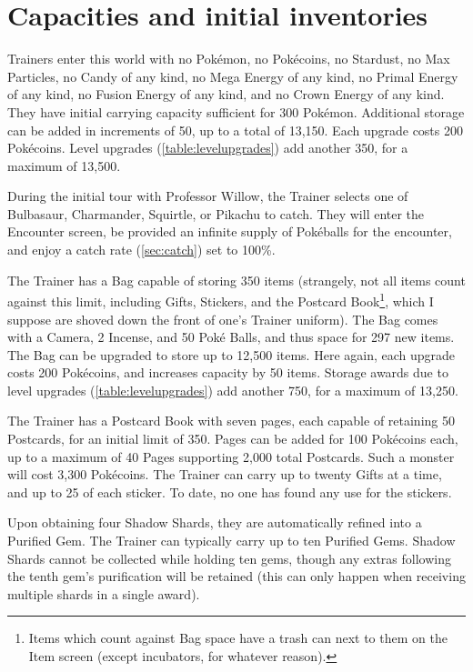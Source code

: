 \section{Capacities and initial inventories\label{sec:capacities}}
Trainers enter this world with no Pokémon, no Pokécoins, no Stardust,
  no Max Particles, no Candy of any kind, no Mega Energy of any kind,
  no Primal Energy of any kind, no Fusion Energy of any kind, and no Crown
  Energy of any kind.
They have initial carrying capacity sufficient for 300 Pokémon.
Additional storage can be added in increments of 50, up to a total of 13,150.
Each upgrade costs 200 Pokécoins.
Level upgrades (\autoref{table:levelupgrades}) add another 350, for a maximum of 13,500.

During the initial tour with Professor Willow, the Trainer selects one of
 Bulbasaur, Charmander, Squirtle, or Pikachu to catch.
They will enter the Encounter screen, be provided an infinite supply of
  Pokéballs for the encounter, and enjoy a catch rate (\autoref{sec:catch}) set to 100\%.

The Trainer has a Bag capable of storing 350 items (strangely, not all items
  count against this limit, including Gifts, Stickers, and the Postcard Book\footnote{Items which count against Bag space have a trash can next to them on the Item screen (except incubators, for whatever reason).},
  which I suppose are shoved down the front of one's Trainer uniform).
The Bag comes with a Camera, 2 Incense, and 50 Poké Balls,
  and thus space for 297 new items.
The Bag can be upgraded to store up to 12,500 items.
Here again, each upgrade costs 200 Pokécoins, and increases capacity by 50 items.
Storage awards due to level upgrades (\autoref{table:levelupgrades}) add another 750, for a maximum of 13,250.

The Trainer has a Postcard Book with seven pages, each capable of retaining
 50 Postcards, for an initial limit of 350.
Pages can be added for 100 Pokécoins each, up to a maximum of 40 Pages
 supporting 2,000 total Postcards.
Such a monster will cost 3,300 Pokécoins.
The Trainer can carry up to twenty Gifts at a time, and up to 25 of each sticker.
To date, no one has found any use for the stickers.

Upon obtaining four Shadow Shards, they are automatically refined into a Purified Gem.
The Trainer can typically carry up to ten Purified Gems.
Shadow Shards cannot be collected while holding ten gems, though any extras
 following the tenth gem's purification will be retained (this can only
 happen when receiving multiple shards in a single award).

